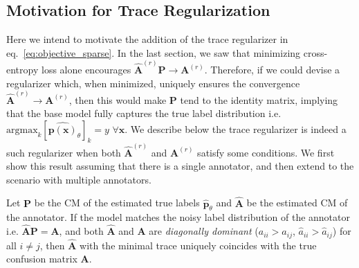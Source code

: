 \clearpage
\subsection{Motivation for Trace Regularization}\label{sec:theorems}
Here we intend to motivate the addition of the trace regularizer in eq.~\ref{eq:objective_sparse}. In the last section, we saw that minimizing cross-entropy loss alone encourages $\hat{\textbf{A}}^{(r)}\textbf{P}\rightarrow \textbf{A}^{(r)}$. Therefore, if we could devise a regularizer which, when minimized, uniquely ensures the convergence $\hat{\textbf{A}}^{(r)}\rightarrow\textbf{A}^{(r)}$, then this would make $\textbf{P}$ tend to the identity matrix, implying that the base model fully captures the true label distribution i.e. $\text{argmax}_{k}[\hat{\textbf{p}(\mathbf{x})}_{\theta}]_{k} =  y\,\, \forall \mathbf{x}$. We describe below the trace regularizer is indeed a such regularizer when both $\hat{\mathbf{A}}^{(r)}$ and $\mathbf{A}^{(r)}$ satisfy some conditions. We first show this result assuming that there is a single annotator, and then extend to the scenario with multiple annotators.  

\begin{lemma}
\label{lemma:1}
Let $\textbf{P}$ be the CM of the estimated true labels $\hat{\textbf{p}}_{\theta}$ and $\hat{\textbf{A}}$ be the estimated CM of the annotator. If the model matches the noisy label distribution of the annotator i.e. $\hat{\textbf{A}}\textbf{P}=\textbf{A} $, and both $\hat{\textbf{A}}$ and $\textbf{A}$ are \textit{diagonally dominant} ($a_{ii} > a_{ij}$, $\hat{a}_{ii} > \hat{a}_{ij}$) for all $i \neq j$, then $\hat{\textbf{A}}$ with the minimal trace uniquely coincides with the true confusion matrix $\textbf{A}$. %
\end{lemma}

